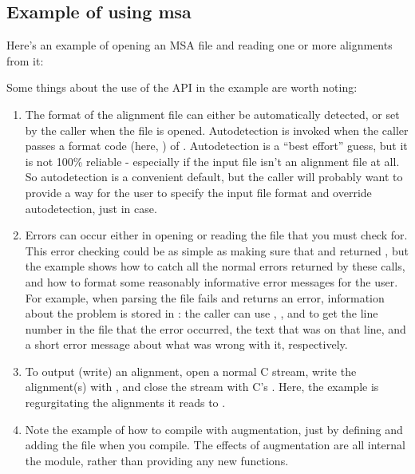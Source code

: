 \subsection{Example of using msa}

Here's an example of opening an MSA file and reading one or more
alignments from it:



Some things about the use of the API in the example are worth noting:

\begin{enumerate}
\item The format of the alignment file can either be automatically
      detected, or set by the caller when the file is opened.
      Autodetection is invoked when the caller passes a format code
      (here, ) of
      . Autodetection is a ``best effort''
      guess, but it is not 100\% reliable - especially if the input
      file isn't an alignment file at all. So autodetection is a
      convenient default, but the caller will probably want to provide
      a way for the user to specify the input file format and override
      autodetection, just in case.

\item Errors can occur either in opening or reading the file that you
      must check for. This error checking could be as simple as making
      sure that  and
       returned , but the example
      shows how to catch all the normal errors returned by these
      calls, and how to format some reasonably informative error
      messages for the user. For example, when parsing the file fails
      and  returns an 
      error, information about the problem is stored in :
      the caller can use , ,
      and  to get the line number in the file that
      the error occurred, the text that was on that line, and a short
      error message about what was wrong with it, respectively.

\item To output (write) an alignment, open a normal C 
      stream, write the alignment(s) with ,
      and close the stream with C's . Here, the
      example is regurgitating the alignments it reads to
      .

\item Note the example of how to compile with 
      augmentation, just by defining  and
      adding the  file when you compile. The
      effects of  augmentation are all internal the
       module, rather than providing any new functions.
\end{enumerate}

